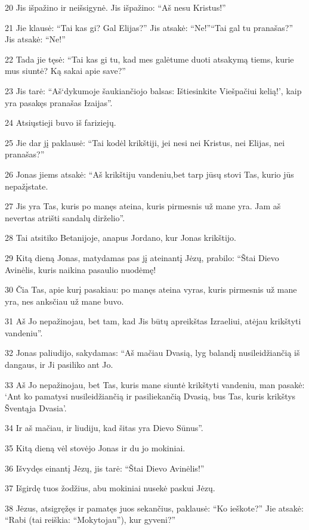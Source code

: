 \par 20 Jis išpažino ir neišsigynė. Jis išpažino: “Aš nesu Kristus!” 
\par 21 Jie klausė: “Tai kas gi? Gal Elijas?” Jis atsakė: “Ne!”­“Tai gal tu pranašas?” Jis atsakė: “Ne!” 
\par 22 Tada jie tęsė: “Tai kas gi tu, kad mes galėtume duoti atsakymą tiems, kurie mus siuntė? Ką sakai apie save?” 
\par 23 Jis tarė: “Aš­‘dykumoje šaukiančiojo balsas: Ištiesinkite Viešpačiui kelią!’, kaip yra pasakęs pranašas Izaijas”. 
\par 24 Atsiųstieji buvo iš fariziejų. 
\par 25 Jie dar jį paklausė: “Tai kodėl krikštiji, jei nesi nei Kristus, nei Elijas, nei pranašas?” 
\par 26 Jonas jiems atsakė: “Aš krikštiju vandeniu,­bet tarp jūsų stovi Tas, kurio jūs nepažįstate. 
\par 27 Jis yra Tas, kuris po manęs ateina, kuris pirmesnis už mane yra. Jam aš nevertas atrišti sandalų dirželio”. 
\par 28 Tai atsitiko Betanijoje, anapus Jordano, kur Jonas krikštijo. 
\par 29 Kitą dieną Jonas, matydamas pas jį ateinantį Jėzų, prabilo: “Štai Dievo Avinėlis, kuris naikina pasaulio nuodėmę! 
\par 30 Čia Tas, apie kurį pasakiau: po manęs ateina vyras, kuris pirmesnis už mane yra, nes anksčiau už mane buvo. 
\par 31 Aš Jo nepažinojau, bet tam, kad Jis būtų apreikštas Izraeliui, atėjau krikštyti vandeniu”. 
\par 32 Jonas paliudijo, sakydamas: “Aš mačiau Dvasią, lyg balandį nusileidžiančią iš dangaus, ir Ji pasiliko ant Jo. 
\par 33 Aš Jo nepažinojau, bet Tas, kuris mane siuntė krikštyti vandeniu, man pasakė: ‘Ant ko pamatysi nusileidžiančią ir pasiliekančią Dvasią, bus Tas, kuris krikštys Šventąja Dvasia’. 
\par 34 Ir aš mačiau, ir liudiju, kad šitas yra Dievo Sūnus”. 
\par 35 Kitą dieną vėl stovėjo Jonas ir du jo mokiniai. 
\par 36 Išvydęs einantį Jėzų, jis tarė: “Štai Dievo Avinėlis!” 
\par 37 Išgirdę tuos žodžius, abu mokiniai nusekė paskui Jėzų. 
\par 38 Jėzus, atsigręžęs ir pamatęs juos sekančius, paklausė: “Ko ieškote?” Jie atsakė: “Rabi (tai reiškia: “Mokytojau”), kur gyveni?” 
